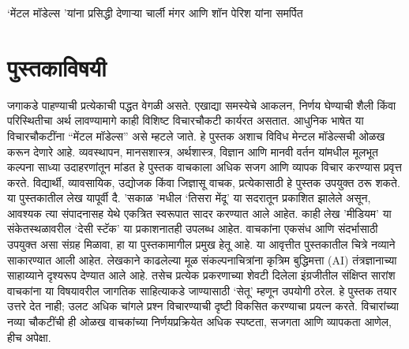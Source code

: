 \begin{dedication}
`मेंटल मॉडेल्स 'यांना प्रसिद्धी देणाऱ्या चार्ली मंगर आणि शॉन पेरिश यांना समर्पित  
\end{dedication}

\clearpage

\chapter*{पुस्तकाविषयी }
जगाकडे पाहण्याची प्रत्येकाची पद्धत वेगळी असते. एखाद्या समस्येचे आकलन, निर्णय घेण्याची शैली किंवा परिस्थितीचा अर्थ लावण्यामागे काही विशिष्ट विचारचौकटी कार्यरत असतात. आधुनिक भाषेत या विचारचौकटींना “मेंटल मॉडेल्स” असे म्हटले जाते.
हे पुस्तक अशाच विविध मेन्टल मॉडेल्सची ओळख करून देणारे आहे. व्यवस्थापन, मानसशास्त्र, अर्थशास्त्र, विज्ञान आणि मानवी वर्तन यांमधील मूलभूत कल्पना साध्या उदाहरणांतून मांडत हे पुस्तक वाचकाला अधिक सजग आणि व्यापक विचार करण्यास प्रवृत्त करते. विद्यार्थी, व्यावसायिक, उद्योजक किंवा जिज्ञासू वाचक,  प्रत्येकासाठी हे पुस्तक उपयुक्त ठरू शकते.
या पुस्तकातील लेख यापूर्वी दै. 'सकाळ 'मधील ‘तिसरा मेंदू’ या सदरातून प्रकाशित झालेले असून, आवश्यक त्या संपादनासह येथे एकत्रित स्वरूपात सादर करण्यात आले आहेत. काही लेख 'मीडियम' या संकेतस्थळावरील ‘देसी स्टॅक’ या प्रकाशनातही उपलब्ध आहेत. वाचकांना एकसंध आणि संदर्भासाठी उपयुक्त असा संग्रह मिळावा, हा या पुस्तकामागील प्रमुख हेतू आहे.
या आवृत्तीत पुस्तकातील चित्रे नव्याने साकारण्यात आली आहेत. लेखकाने काढलेल्या मूळ संकल्पनाचित्रांना कृत्रिम बुद्धिमत्ता (AI) तंत्रज्ञानाच्या साहाय्याने दृश्यरूप देण्यात आले आहे. तसेच प्रत्येक प्रकरणाच्या शेवटी दिलेला इंग्रजीतील संक्षिप्त सारांश वाचकांना या विषयावरील जागतिक साहित्याकडे जाण्यासाठी ‘सेतू’ म्हणून उपयोगी ठरेल.
हे पुस्तक तयार उत्तरे देत नाही; उलट अधिक चांगले प्रश्न विचारण्याची दृष्टी विकसित करण्याचा प्रयत्न करते. विचारांच्या नव्या चौकटींची ही ओळख वाचकांच्या निर्णयप्रक्रियेत अधिक स्पष्टता, सजगता आणि व्यापकता आणेल, हीच अपेक्षा.



